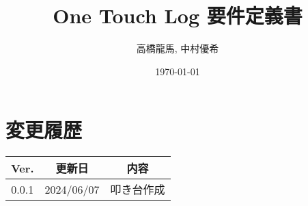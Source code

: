 \documentclass[a4paper,10pt,titlepage]{jreport}
\begin{document}
\title{One Touch Log 要件定義書}
\author{高橋龍馬, 中村優希}
\date{\today}
\maketitle

\section*{変更履歴}

\begin{longtable}[c]{|c|c|c|}
    \hline
        Ver. & 更新日 & 内容 \\
    \hline
    \endfirsthead
    \hline
        0.0.1 & 2024/06/07 & 叩き台作成 \\
    \hline
\end{longtable}

\newpage

\tableofcontents
\clearpage





\end{document}
